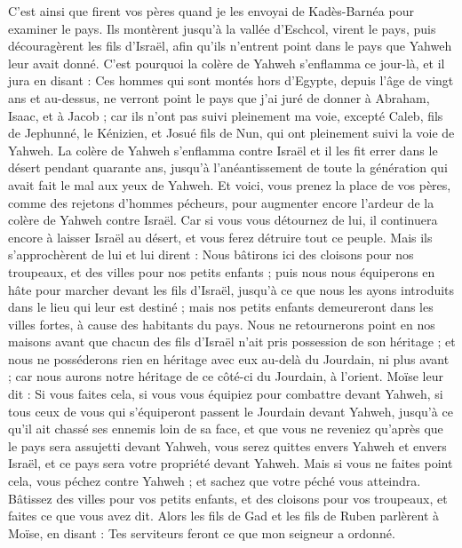 \begin{multicols}{2}
C'est ainsi que firent vos pères quand je les envoyai de Kadès-Barnéa pour examiner le pays.
Ils montèrent jusqu'à la vallée d'Eschcol, virent le pays, puis découragèrent les fils d'Israël, afin qu'ils n'entrent point dans le pays que Yahweh leur avait donné.
C'est pourquoi la colère de Yahweh s'enflamma ce jour-là, et il jura en disant :
Ces hommes qui sont montés hors d'Egypte, depuis l'âge de vingt ans et au-dessus, ne verront point le pays que j'ai juré de donner à Abraham, Isaac, et à Jacob ; car ils n'ont pas suivi pleinement ma voie,
excepté Caleb, fils de Jephunné, le Kénizien, et Josué fils de Nun, qui ont pleinement suivi la voie de Yahweh.
La colère de Yahweh s'enflamma contre Israël et il les fit errer dans le désert pendant quarante ans, jusqu’à l’anéantissement de toute la génération qui avait fait le mal aux yeux de Yahweh.
Et voici, vous prenez la place de vos pères, comme des rejetons d'hommes pécheurs, pour augmenter encore l'ardeur de la colère de Yahweh contre Israël.
Car si vous vous détournez de lui, il continuera encore à laisser Israël au désert, et vous ferez détruire tout ce peuple.
Mais ils s'approchèrent de lui et lui dirent : Nous bâtirons ici des cloisons pour nos troupeaux, et des villes pour nos petits enfants ;
puis nous nous équiperons en hâte pour marcher devant les fils d'Israël, jusqu'à ce que nous les ayons introduits dans le lieu qui leur est destiné ; mais nos petits enfants demeureront dans les villes fortes, à cause des habitants du pays.
Nous ne retournerons point en nos maisons avant que chacun des fils d'Israël n'ait pris possession de son héritage ;
et nous ne posséderons rien en héritage avec eux au-delà du Jourdain, ni plus avant ; car nous aurons notre héritage de ce côté-ci du Jourdain, à l'orient.
Moïse leur dit : Si vous faites cela, si vous vous équipiez pour combattre devant Yahweh,
si tous ceux de vous qui s’équiperont passent le Jourdain devant Yahweh, jusqu'à ce qu'il ait chassé ses ennemis loin de sa face,
et que vous ne reveniez qu'après que le pays sera assujetti devant Yahweh, vous serez quittes envers Yahweh et envers Israël, et ce pays sera votre propriété devant Yahweh.
Mais si vous ne faites point cela, vous péchez contre Yahweh ; et sachez que votre péché vous atteindra.
Bâtissez des villes pour vos petits enfants, et des cloisons pour vos troupeaux, et faites ce que vous avez dit.
Alors les fils de Gad et les fils de Ruben parlèrent à Moïse, en disant : Tes serviteurs feront ce que mon seigneur a ordonné.

\end{multicols}
